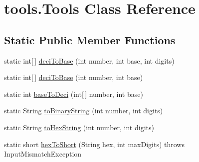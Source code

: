 \hypertarget{classtools_1_1_tools}{\section{tools.\-Tools Class Reference}
\label{classtools_1_1_tools}
}
\subsection*{Static Public Member Functions}
\begin{DoxyCompactItemize}
\item 
static int\mbox{[}$\,$\mbox{]} \hyperlink{classtools_1_1_tools_a621ac19b273c9133ccb49f88b5471c57}{deci\-To\-Base} (int number, int base, int digits)
\item 
static int\mbox{[}$\,$\mbox{]} \hyperlink{classtools_1_1_tools_aba05ac830f156b291a0bf96b37a69283}{deci\-To\-Base} (int number, int base)
\item 
static int \hyperlink{classtools_1_1_tools_aa434ed3be898880a6c173cef2b5993f0}{base\-To\-Deci} (int\mbox{[}$\,$\mbox{]} number, int base)
\item 
static String \hyperlink{classtools_1_1_tools_ab0e03a005710d3634755829037e9e8f4}{to\-Binary\-String} (int number, int digits)
\item 
static String \hyperlink{classtools_1_1_tools_a516db6be7076f6f06b28097571fe4d86}{to\-Hex\-String} (int number, int digits)
\item 
static short \hyperlink{classtools_1_1_tools_addca99979e298d0344eebc63c472d321}{hex\-To\-Short} (String hex, int max\-Digits)  throws Input\-Mismatch\-Exception 
\end{DoxyCompactItemize}


